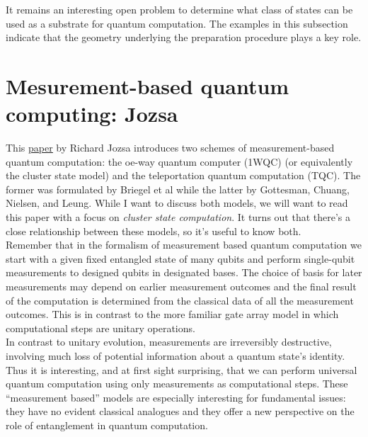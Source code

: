 \documentclass{book}
\theoremstyle{definition}
\begin{document}
It remains an interesting open problem to determine what class of states can be used as
a substrate for quantum computation. The examples in this subsection indicate that the
geometry underlying the preparation procedure plays a key role.
	



	
















\newpage

\section{Mesurement-based quantum computing: Jozsa}

This \href{https://arxiv.org/pdf/quant-ph/0508124.pdf}{\underline{paper}} by Richard Jozsa introduces two schemes of measurement-based quantum computation: the oe-way quantum computer (1WQC) (or equivalently the cluster state model) and the teleportation quantum computation (TQC).  The former was formulated by Briegel et al while the latter by Gottesman, Chuang, Nielsen, and Leung. While I want to discuss both models, we will want to read this paper with a focus on \textit{cluster state computation}. It turns out that there's a close relationship between these models, so it's useful to know both.\\

Remember that in the formalism of measurement based quantum computation we start with a given fixed entangled state of many qubits and perform single-qubit measurements to designed qubits in designated bases. The choice of basis for later
measurements may depend on earlier measurement outcomes and the final result of the computation is determined from the classical data of all the measurement outcomes. This is in contrast to the more familiar gate array model in which computational steps are unitary operations.\\

In contrast to unitary evolution, measurements are irreversibly destructive, involving much loss of potential information about a quantum state’s identity. Thus it is interesting, and at first sight surprising, that we can perform universal quantum computation using only measurements
as computational steps. These ``measurement based'' models are especially interesting for fundamental issues: they have no evident classical analogues and they offer a new perspective on the role of entanglement in quantum computation. 
\end{document}
